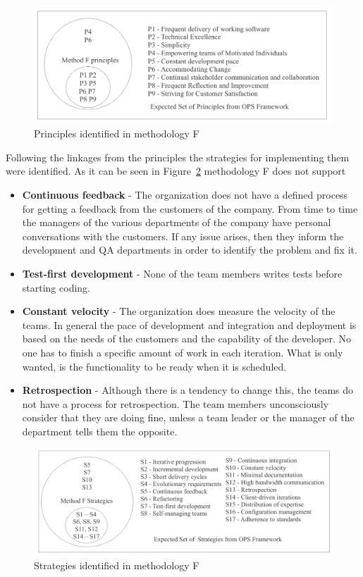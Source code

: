 \begin{figure}[H]
\centerline{\includegraphics[scale=0.9]{include/case_study/fig/companyF_principles.pdf}}
\caption{Principles identified in methodology F} 
\label{fig:companyF_principles}
\end{figure}

Following the linkages from the principles the strategies for implementing them were identified. As it can be seen in Figure~\ref{fig:companyF_strategies} methodology F does not support 

\begin{itemize}
\item \textbf{Continuous feedback} - The organization does not have a defined process for getting a feedback from the customers of the company. From time to time the managers of the various departments of the company have personal conversations with the customers. If any issue arises, then they inform the development and QA departments in order to identify the problem and fix it.
\item \textbf{Test-first development} - None of the team members writes tests before starting coding.
\item \textbf{Constant velocity} - The organization does measure the velocity of the teams. In general the pace of development and integration and deployment is based on the needs of the customers and the capability of the developer. No one has to finish a specific amount of work in each iteration. What is only wanted, is the functionality to be ready when it is scheduled.
\item \textbf{Retrospection} - Although there is a tendency to change this, the teams do not have a process for retrospection. The team members unconsciously consider that they are doing fine, unless a team leader or the manager of the department tells them the opposite.
\end{itemize}

\begin{figure}[H]
\centerline{\includegraphics[scale=0.9]{include/case_study/fig/companyF_strategies.pdf}}
\caption{Strategies identified in methodology F} 
\label{fig:companyF_strategies}
\end{figure}


